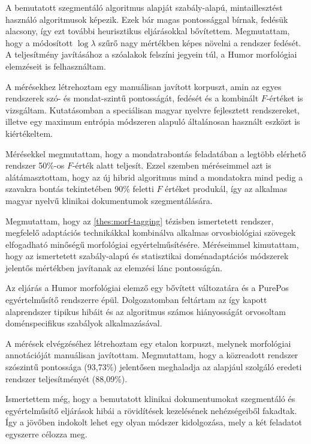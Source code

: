 A bemutatott szegmentáló algoritmus alapját szabály-alapú, mintaillesztést használó algoritmusok képezik. 
Ezek bár magas pontossággal bírnak, fedésük alacsony, így ezt további heurisztikus eljárásokkal bővítettem.
Megmutattam, hogy a módosított $\log \lambda$ szűrő nagy mértékben képes növelni a rendszer fedését. 
A teljesítmény javításához a szóalakok felszíni jegyein túl, a Humor morfológiai elemzéseit is felhasználtam.

A mérésekhez létrehoztam egy manuálisan javított korpuszt, amin az egyes rendszerek szó- és mondat-szintű pontosságát, fedését és a kombinált $F$-értéket is vizsgáltam.  
Kutatásomban a speciálisan magyar nyelvre fejlesztett rendszereket, illetve egy maximum entrópia módszeren alapuló általánosan használt eszközt is kiértékeltem.

Mérésekkel megmutattam, hogy a mondatrabontás feladatában a legtöbb elérhető rendszer 50\%-os $F$-érték alatt teljesít. 
Ezzel szemben méréseimmel azt is alátámasztottam, hogy az új hibrid algoritmus mind a mondatokra mind pedig a szavakra bontás tekintetében 90\% feletti $F$ értéket produkál, így az alkalmas 
magyar nyelvű klinikai dokumentumok szegmentálására.

\thesisline%

\begin{core}
\begin{thesis}%
\label{thes:clin-pos}
Megmutattam, hogy az \ref{thes:morf-tagging} tézisben ismertetett rendszer, megfelelő adaptációs technikákkal kombinálva alkalmas orvosbiológiai szövegek elfogadható minőségű morfológiai egyértelműsítésére. 
Méréseimmel kimutattam, hogy az ismertetett szabály-alapú és statisztikai doménadaptációs módszerek jelentős mértékben javítanak az elemzési lánc pontosságán.
\end{thesis}

\begin{pub}
\cite{Orosz2013,Orosz2014b} 
\end{pub}
\end{core}

Az eljárás a Humor morfológiai elemző egy bővített változatára és a PurePos egyértelműsítő rendszerre épül. 
Dolgozatomban feltártam az így kapott alaprendszer tipikus hibáit és az algoritmus számos hiányosságát orvosoltam doménspecifikus szabályok alkalmazásával. 

A mérések elvégzéséhez létrehoztam egy etalon korpuszt, melynek morfológiai annotációját manuálisan javítottam. 
Megmutattam, hogy a közreadott rendszer szószintű pontossága (93,73\%) jelentősen meghaladja az alapjául szolgáló eredeti rendszer teljesítményét (88,09\%). 

Ismertettem még, hogy a bemutatott klinikai dokumentumokat szegmentáló és egyértelműsítő eljárások hibái a rövidítések kezelésének nehézségeiből fakadtak.
Így a jövőben indokolt lehet egy olyan módszer kidolgozása, mely a két feladatot egyszerre célozza meg.

\let\thesubsection=\oldthesubsection
